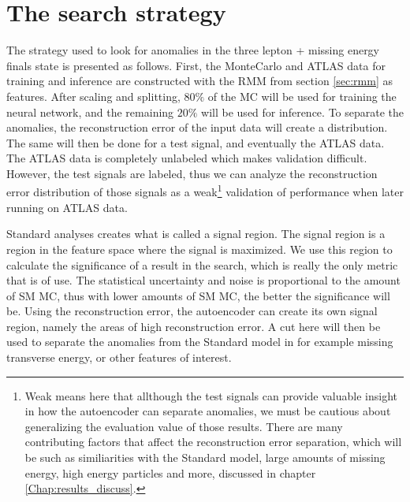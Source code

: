 \section{The search strategy}
The strategy used to look for anomalies in the three lepton + missing energy finals state is presented as follows. 
First, the MonteCarlo and ATLAS data 
for training and inference are constructed with the RMM from section \ref{sec:rmm} as features. After scaling and 
splitting, $80\%$ of the MC will be used for 
training the neural network, and the remaining $20\%$ will be used for inference. To separate the anomalies, the 
reconstruction error of the input data 
will create a distribution. The same will then be done for a test signal, and eventually the ATLAS data. The 
ATLAS data is completely unlabeled which 
makes validation difficult. However, the test signals are labeled, thus we can analyze the reconstruction error 
distribution of those signals as a 
weak\footnote{Weak means here that allthough the test signals can provide valuable insight in how the autoencoder 
can separate anomalies,
 we must be cautious about generalizing the evaluation value of those results. There are many contributing factors 
 that affect the reconstruction error separation, 
 which will be such as similiarities with the Standard model, large amounts of missing energy, high energy particles 
 and more,  discussed in chapter \ref{Chap:results_discuss}. } 
 validation of performance when later running on ATLAS data. 
 
Standard analyses creates what is called a signal region. The signal region is a region in the feature space where 
the signal is maximized. We use this region to calculate the 
significance of a result in the search, which is really the only metric that is of use. The statistical uncertainty 
and noise is proportional to the amount of SM MC, thus
with lower amounts of SM MC, the better the significance will be. Using the reconstruction error, the autoencoder 
can create its own signal region, 
namely the areas of high reconstruction error. A cut here will then be used to separate the anomalies from the 
Standard model in for example missing transverse energy, or 
other features of interest. \par 

